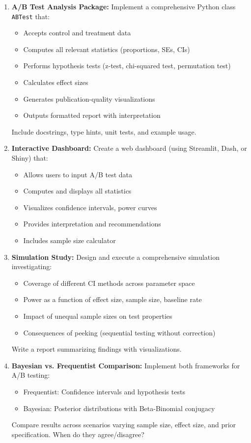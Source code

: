 \begin{enumerate}
    \item \textbf{A/B Test Analysis Package:} Implement a comprehensive Python class \texttt{ABTest} that:
    \begin{itemize}
        \item Accepts control and treatment data
        \item Computes all relevant statistics (proportions, SEs, CIs)
        \item Performs hypothesis tests (z-test, chi-squared test, permutation test)
        \item Calculates effect sizes
        \item Generates publication-quality visualizations
        \item Outputs formatted report with interpretation
    \end{itemize}
    Include docstrings, type hints, unit tests, and example usage.

    \item \textbf{Interactive Dashboard:} Create a web dashboard (using Streamlit, Dash, or Shiny) that:
    \begin{itemize}
        \item Allows users to input A/B test data
        \item Computes and displays all statistics
        \item Visualizes confidence intervals, power curves
        \item Provides interpretation and recommendations
        \item Includes sample size calculator
    \end{itemize}

    \item \textbf{Simulation Study:} Design and execute a comprehensive simulation investigating:
    \begin{itemize}
        \item Coverage of different CI methods across parameter space
        \item Power as a function of effect size, sample size, baseline rate
        \item Impact of unequal sample sizes on test properties
        \item Consequences of peeking (sequential testing without correction)
    \end{itemize}
    Write a report summarizing findings with visualizations.

    \item \textbf{Bayesian vs. Frequentist Comparison:} Implement both frameworks for A/B testing:
    \begin{itemize}
        \item Frequentist: Confidence intervals and hypothesis tests
        \item Bayesian: Posterior distributions with Beta-Binomial conjugacy
    \end{itemize}
    Compare results across scenarios varying sample size, effect size, and prior specification. When do they agree/disagree?
\end{enumerate}

